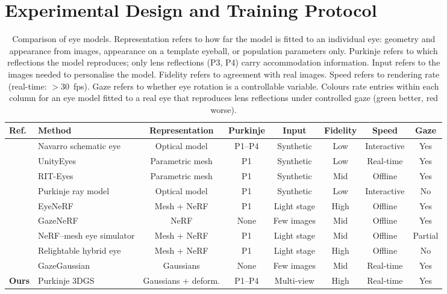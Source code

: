 \documentclass[sigconf,screen,review]{acmart}
\newcommand{\G}[1]{\cellcolor{GoodBG}#1}
\newcommand{\M}[1]{\cellcolor{MidBG}#1}
\newcommand{\R}[1]{\cellcolor{LowBG}#1}
\begin{document}
\section{Experimental Design and Training Protocol}

\begin{table}[t]
\centering
\caption[Comparison of eye models]{Comparison of eye models. Representation refers to how far the model is fitted to an individual eye: geometry and appearance from images, appearance on a template eyeball, or population parameters only. Purkinje refers to which reflections the model reproduces; only lens reflections (P3, P4) carry accommodation information. Input refers to the images needed to personalise the model. Fidelity refers to agreement with real images. Speed refers to rendering rate (real-time: $>$30~fps). Gaze refers to whether eye rotation is a controllable variable. Colours rate entries within each column for an eye model fitted to a real eye that reproduces lens reflections under controlled gaze (green better, red worse).}
\label{tab:eye_rendering}

\small
\begin{tabular}{llcccccc}
\toprule
Ref. & Method & Representation & Purkinje & Input & Fidelity & Speed & Gaze \\
\midrule
\cite{Navarro1985Accommodation} & Navarro schematic eye
& \R{Optical model} & \G{P1--P4} & \R{Synthetic} & \R{Low} & \M{Interactive} & \G{Yes} \\
\cite{UnityEyes} & UnityEyes
& \R{Parametric mesh} & \M{P1} & \R{Synthetic} & \R{Low} & \G{Real-time} & \G{Yes} \\
\cite{RIT-Eyes} & RIT-Eyes
& \R{Parametric mesh} & \M{P1} & \R{Synthetic} & \M{Mid} & \R{Offline} & \G{Yes} \\
\cite{Keratoconus_Purkinje} & Purkinje ray model
& \R{Optical model} & \M{P1} & \R{Synthetic} & \R{Low} & \M{Interactive} & \R{No} \\
\cite{EyeNeRF} & EyeNeRF
& \M{Mesh + NeRF} & \M{P1} & \M{Light stage} & \G{High} & \R{Offline} & \G{Yes} \\
\cite{GazeNeRF_2023} & GazeNeRF
& \G{NeRF} & \R{None} & \G{Few images} & \M{Mid} & \R{Offline} & \G{Yes} \\
\cite{Digital_Eye_Tracker_Prototyper} & NeRF--mesh eye simulator
& \M{Mesh + NeRF} & \M{P1} & \M{Light stage} & \M{Mid} & \R{Offline} & \M{Partial} \\
\cite{Realistic_nerf_eyes} & Relightable hybrid eye
& \M{Mesh + NeRF} & \M{P1} & \M{Light stage} & \G{High} & \R{Offline} & \R{No} \\
\cite{GazeGaussian_2024} & GazeGaussian
& \G{Gaussians} & \R{None} & \G{Few images} & \M{Mid} & \G{Real-time} & \G{Yes} \\
\textbf{Ours} & Purkinje 3DGS
& \G{Gaussians + deform.} & \G{P1--P4} & \M{Multi-view} & \G{High} & \G{Real-time} & \G{Yes} \\

\bottomrule
\end{tabular}
\end{table}
\end{document}
